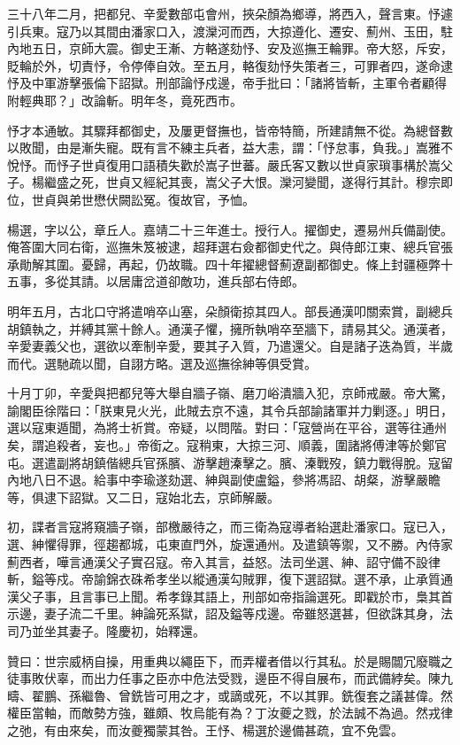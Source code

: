 \begin{pinyinscope}
三十八年二月，把都兒、辛愛數部屯會州，挾朵顏為鄉導，將西入，聲言東。忬遽引兵東。寇乃以其間由潘家口入，渡灤河而西，大掠遵化、遷安、薊州、玉田，駐內地五日，京師大震。御史王漸、方輅遂劾忬、安及巡撫王輪罪。帝大怒，斥安，貶輪於外，切責忬，令停俸自效。至五月，輅復劾忬失策者三，可罪者四，遂命逮忬及中軍游擊張倫下詔獄。刑部論忬戍邊，帝手批曰：「諸將皆斬，主軍令者顧得附輕典耶？」改論斬。明年冬，竟死西市。

忬才本通敏。其驟拜都御史，及屢更督撫也，皆帝特簡，所建請無不從。為總督數以敗聞，由是漸失寵。既有言不練主兵者，益大恚，謂：「忬怠事，負我。」嵩雅不悅忬。而忬子世貞復用口語積失歡於嵩子世蕃。嚴氏客又數以世貞家瑣事構於嵩父子。楊繼盛之死，世貞又經紀其喪，嵩父子大恨。灤河變聞，遂得行其計。穆宗即位，世貞與弟世懋伏闕訟冤。復故官，予恤。

楊選，字以公，章丘人。嘉靖二十三年進士。授行人。擢御史，遷易州兵備副使。俺答圍大同右衛，巡撫朱笈被逮，超拜選右僉都御史代之。與侍郎江東、總兵官張承勛解其圍。憂歸，再起，仍故職。四十年擢總督薊遼副都御史。條上封疆極弊十五事，多從其請。以居庸岔道卻敵功，進兵部右侍郎。

明年五月，古北口守將遣哨卒山塞，朵顏衛掠其四人。部長通漢叩關索賞，副總兵胡鎮執之，并縛其黨十餘人。通漢子懼，擁所執哨卒至牆下，請易其父。通漢者，辛愛妻義父也，選欲以牽制辛愛，要其子入質，乃遣還父。自是諸子迭為質，半歲而代。選馳疏以聞，自詡方略。選及巡撫徐紳等俱受賞。

十月丁卯，辛愛與把都兒等大舉自牆子嶺、磨刀峪潰牆入犯，京師戒嚴。帝大驚，諭閣臣徐階曰：「朕東見火光，此賊去京不遠，其令兵部諭諸軍并力剿逐。」明日，選以寇東遁聞，為將士祈賞。帝疑，以問階。對曰：「寇營尚在平谷，選等往通州矣，謂追殺者，妄也。」帝銜之。寇稍東，大掠三河、順義，圍諸將傅津等於鄭官屯。選遣副將胡鎮偕總兵官孫臏、游擊趙溱擊之。臏、溱戰歿，鎮力戰得脫。寇留內地八日不退。給事中李瑜遂劾選、紳與副使盧鎰，參將馮詔、胡粲，游擊嚴瞻等，俱逮下詔獄。又二日，寇始北去，京師解嚴。

初，諜者言寇將窺牆子嶺，部檄嚴待之，而三衛為寇導者紿選赴潘家口。寇已入，選、紳懼得罪，徑趨都城，屯東直門外，旋還通州。及遣鎮等禦，又不勝。內侍家薊西者，嘩言通漢父子實召寇。帝入其言，益怒。法司坐選、紳、詔守備不設律斬，鎰等戍。帝諭錦衣硃希孝坐以縱通漢勾賊罪，復下選詔獄。選不承，止承質通漢父子事，且言事已上聞。希孝錄其語上，刑部如帝指論選死。即戳於市，梟其首示邊，妻子流二千里。紳論死系獄，詔及鎰等戍邊。帝雖怒選甚，但欲誅其身，法司乃並坐其妻子。隆慶初，始釋還。

贊曰：世宗威柄自操，用重典以繩臣下，而弄權者借以行其私。於是賜闒冗廢職之徒事敗伏辜，而出力任事之臣亦中危法受戮，邊臣不得自展布，而武備綍矣。陳九疇、翟鵬、孫繼魯、曾銑皆可用之才，或謫或死，不以其罪。銑復套之議甚偉。然權臣當軸，而敵勢方強，雖頗、牧烏能有為？丁汝夔之戮，於法誠不為過。然戎律之弛，有由來矣，而汝夔獨蒙其咎。王忬、楊選於邊備甚疏，宜不免雲。


\end{pinyinscope}